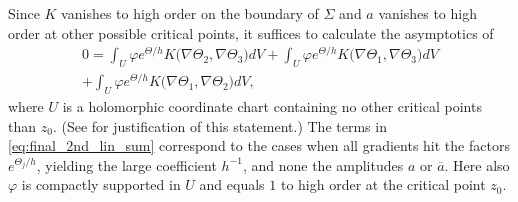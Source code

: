 \documentclass[12pt]{amsart}
\def\R{\mathbb R}
\theoremstyle{definition}
\theoremstyle{remark}
\newcommand{\z}{\overline{z}}
\begin{document}
Since $K$ vanishes to high order on the boundary of $\Sigma$ and $a$ vanishes to high order at other possible critical points, it suffices to calculate the asymptotics of 
\begin{multline}\label{eq:final_2nd_lin_sum}
 0=\int_{U} \varphi e^{\Theta/h} K(\nabla \Theta_2,\nabla \Theta_3\big)dV+\int_{U} \varphi  e^{\Theta/h} K(\nabla \Theta_1,\nabla \Theta_3\big)dV \\
 +\int_{U} \varphi  e^{\Theta/h} K(\nabla \Theta_1,\nabla \Theta_2\big)dV,
\end{multline}
where $U$ is a holomorphic coordinate chart containing no other critical points than $z_0$.   (See \cite[Proof of Proposition 3.1]{carstea2022inverse} for justification of this statement.) 
The terms in \eqref{eq:final_2nd_lin_sum} correspond to the cases when all gradients hit the factors $e^{\Theta_j/h}$, yielding the large coefficient $h^{-1}$,  and none the amplitudes $a$ or $\overline a$. Here also $\varphi$ is compactly supported in $U$ and equals $1$ to high order at the critical point $z_0$.


\end{document}
